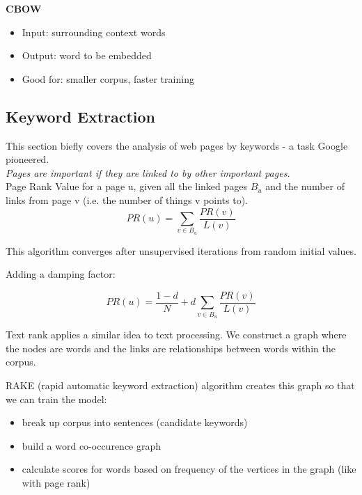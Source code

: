 \documentclass[]{article}
\begin{document}
     
     \textbf{CBOW}
     \begin{itemize}
      \item Input: surrounding context words
      \item Output: word to be embedded
      \item Good for: smaller corpus, faster training
     \end{itemize}
    
    \subsection{Keyword Extraction}
This section biefly covers the analysis of web pages by keywords - a task Google pioneered. \\
    
    \textit{Pages are important if they are linked to by other important pages.} \\
    
    Page Rank Value for a page u, given all the linked pages $B_u$ and the number of links from page v (i.e. the number of things v points to). 
    $$PR(\mathit{u}) = \sum_{v \in B_u} \frac{PR(v)}{L(v)}$$
   
    This algorithm converges after unsupervised iterations from random initial values.
   
    Adding a damping factor: 
    
    $$PR(\mathit{u}) = \frac{1-d}{N} + d \sum_{v \in B_u} \frac{PR(v)}{L(v)}$$
    
    Text rank applies a similar idea to text processing. We construct a graph where the nodes are words and the links are relationships between words within the corpus.
    
    RAKE (rapid automatic keyword extraction) algorithm creates this graph so that we can train the model:
    
    \begin{itemize}
     \item break up corpus into sentences (candidate keywords)
     \item build a word co-occurence graph
     \item calculate scores for words based on frequency of the vertices in the graph (like with page rank)
    \end{itemize}
    
    \clearpage
\end{document}
